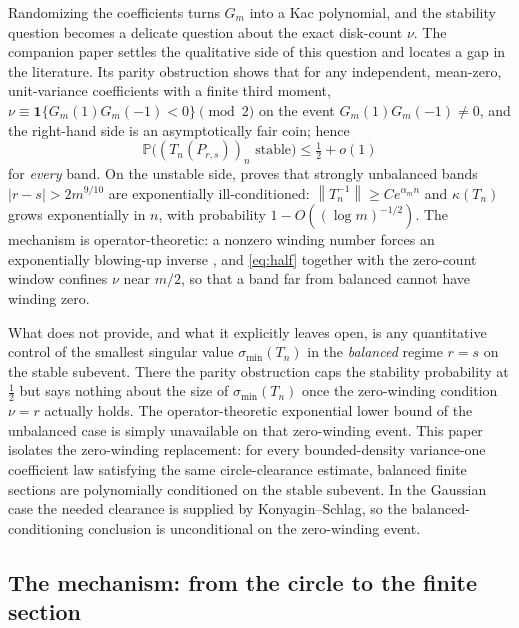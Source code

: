 \documentclass[11pt]{amsart}
\numberwithin{equation}{section}
\theoremstyle{definition}
\theoremstyle{remark}
\newcommand{\Prob}{\mathbb P}
\newcommand{\smin}{\sigma_{\min}}
\newcommand{\kdn}{\kappa}
\newcommand{\norm}[1]{\left\lVert #1\right\rVert}
\newcommand{\abs}[1]{\left\lvert #1\right\rvert}
\begin{document}
Randomizing the coefficients turns $G_m$ into a Kac polynomial, and the stability question becomes a delicate question about the exact disk-count $\nu$. The companion paper \cite{Parity} settles the qualitative side of this question and locates a gap in the literature. Its parity obstruction shows that for any independent, mean-zero, unit-variance coefficients with a finite third moment, $\nu\equiv\mathbf1\{G_m(1)G_m(-1)<0\}\pmod2$ on the event $G_m(1)G_m(-1)\ne0$, and the right-hand side is an asymptotically fair coin; hence
\begin{equation}\label{eq:half}
  \Prob\bigl((T_n(P_{r,s}))_n\text{ stable}\bigr)\le\tfrac12+o(1)
\end{equation}
for \emph{every} band. On the unstable side, \cite{Parity} proves that strongly unbalanced bands $\abs{r-s}>2m^{9/10}$ are exponentially ill-conditioned: $\norm{T_n^{-1}}\ge Ce^{\alpha_mn}$ and $\kdn(T_n)$ grows exponentially in $n$, with probability $1-O((\log m)^{-1/2})$. The mechanism is operator-theoretic: a nonzero winding number forces an exponentially blowing-up inverse \cite[Thm.~4.1]{BG}, and \eqref{eq:half} together with the zero-count window confines $\nu$ near $m/2$, so that a band far from balanced cannot have winding zero.

What \cite{Parity} does not provide, and what it explicitly leaves open, is any quantitative control of the smallest singular value $\smin(T_n)$ in the \emph{balanced} regime $r=s$ on the stable subevent. There the parity obstruction caps the stability probability at $\tfrac12$ but says nothing about the size of $\smin(T_n)$ once the zero-winding condition $\nu=r$ actually holds. The operator-theoretic exponential lower bound of the unbalanced case is simply unavailable on that zero-winding event. This paper isolates the zero-winding replacement: for every bounded-density variance-one coefficient law satisfying the same circle-clearance estimate, balanced finite sections are polynomially conditioned on the stable subevent. In the Gaussian case the needed clearance is supplied by Konyagin--Schlag, so the balanced-conditioning conclusion is unconditional on the zero-winding event.

\subsection{The mechanism: from the circle to the finite section}\label{sub:mechanism}
\end{document}
